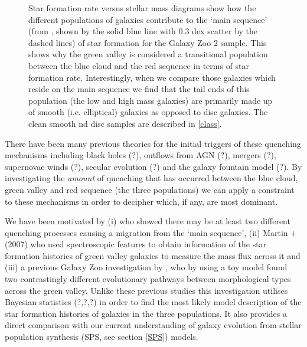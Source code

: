 \documentclass{mn2e}
\begin{document}
\begin{figure}
\caption{Star formation rate versus stellar mass diagrams show how the different populations of galaxies contribute to the `main sequence' (from \citet{Peng}, shown by the solid blue line with 0.3 dex scatter by the dashed lines) of star formation for the Galaxy Zoo 2 sample. This shows why the green valley is considered a transitional population between the blue cloud and the red sequence in terms of star formation rate. Interestingly, when we compare those galaxies which reside on the main sequence we find that the tail ends of this population (the low and high mass galaxies) are primarily made up of smooth (i.e. elliptical) galaxies as opposed to disc galaxies. The clean smooth nd disc samples are described in \ref{class}.}
\label{sfr_mass_sub}
\end{figure}

There have been many previous theories for the initial triggers of these quenching mechanisms including black holes (?), outflows from AGN (?), mergers (?), supernovae winds (?), secular evolution (?) and the galaxy fountain model (?). By investigating the \emph{amount} of quenching that has occurred between the blue cloud, green valley and red sequence (the three populations) we can apply a constraint to these mechanisms in order to decipher which, if any, are most dominant. 

We have been motivated by (i) \citet{Peng} who showed there may be at least two different quenching processes causing a migration from the `main sequence', (ii) Martin +(2007) who used spectroscopic features to obtain information of the star formation histories of green valley galaxies to measure the mass flux across it and (iii) a previous Galaxy Zoo investigation by  \cite{Sch2014}, who by using a toy model found two contrastingly different evolutionary pathways between morphological types across the green valley. Unlike these previous studies this investigation utilises Bayesian statistics (?,?,?) in order to find the most likely model description of the star formation histories of galaxies in the three populations. It also provides a direct comparison with our current understanding of galaxy evolution from stellar population synthesis (SPS, see section \ref{SPS}) models. 
\end{document}
